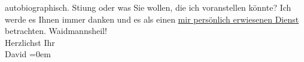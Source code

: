                     autobiographisch. Sti{\geminationm}ung oder was Sie wollen, die
                    ich voranstellen könnte? Ich werde {\pb}es Ihnen immer danken und es als einen \uline{mir
                        persönlich erwiesenen Dienst} betrachten.\pend
           \pstart
           Waidmannsheil!{\\[\baselineskip]}Herzlichst Ihr{\\[\baselineskip]}\spacefill\mbox{David}\pend
           \leftskip=0em{}\endnumbering{}  
      
